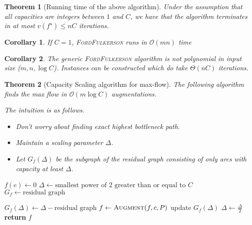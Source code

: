 \documentclass[10pt, oneside, reqno]{amsart}
\theoremstyle{plain}%
\newtheorem{thm}{Theorem}[section]
\newtheorem*{cor}{Corollary}
\theoremstyle{definition}
\theoremstyle{remark}
\newcommand{\bigo}[1]{\mathcal{O}(#1)}
\begin{document}
\begin{thm}[Running time of the above algorithm]
	Under the assumption that all capacities are integers between $1$ and $C$, we have that the algorithm terminates in at most $v(f^\star) \leq nC$ iterations.   
\end{thm}

\begin{cor}
	If $C = 1$, \textsc{FordFulkerson} runs in $\bigo{mn}$ time
\end{cor}


\begin{cor}
	The generic \textsc{FordFulkerson} algorithm is not polynomial in input size ($m,n, \log C$). Instances can be constructed which do take $\Theta(nC)$ iterations.
\end{cor}


\begin{thm}[Capacity Scaling algorithm for max-flow]
	The following algorithm finds the max flow in $\bigo{m \log C}$ augmentations.  
	
	The intuition is as follows.
	\begin{itemize}
		\item Don't worry about finding exact highest bottleneck path.
		\item Maintain a scaling parameter $\Delta$.  
		\item Let $G_f(\Delta)$ be the subgraph of the residual graph consisting of only arcs with capacity at least $\Delta$.
	\end{itemize}
	
\end{thm}
\begin{algorithm}[H]
	\label{alg:dynamic_rising_trend}
	\caption{Capacity scaling algorithm}
	\begin{algorithmic}[1]

		 $f(e) \leftarrow 0$
		\EndFor
		\State $\Delta \leftarrow \text{smallest power of $2$ greater than or equal to $C$}$
		\State $G_f \leftarrow \text{residual graph}$
		
			\State $G_f(\Delta) \leftarrow \Delta-\text{residual graph}$
				\State $f \leftarrow \textsc{Augment}(f, c, P)$
				\State update $G_f(\Delta)$
			\EndWhile
			\State $\Delta \leftarrow \frac{\Delta}{2}$
		\EndWhile
		\State \textbf{return} $f$
	\EndProcedure
	\end{algorithmic}
\end{algorithm}
\end{document}
